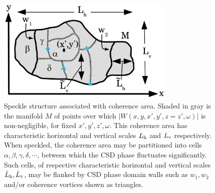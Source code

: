 \documentclass[%
 reprint,
 amsmath,amssymb,
 aps,
]{revtex4-1}
\begin{document}
\begin{figure}
\includegraphics[width=8.5cm]{Figures/CoherenceAreas.png}
\caption{Speckle structure associated with coherence area.  Shaded in gray is the manifold $M$ of points  over which $|W(x,y,x',y',z=z',\omega)|$ is non-negligible, for fixed $x',y',z',\omega$.  This coherence area has characteristic horizontal and vertical scales $L_{\textrm h}$ and $L_{\textrm v}$ respectively.  When speckled, the coherence area may be partitioned into cells $\alpha, \beta,\gamma,\delta,\cdots$, between which the CSD phase fluctuates significantly.  Such cells, of respective characteristic horizontal and vertical scales $\tilde{L}_{\textrm h},\tilde{L}_{\textrm v}$, may be flanked by CSD phase domain walls such as $w_1,w_2$ and/or coherence vortices shown as triangles.}
\label{CoherenceAreas}
\end{figure}
\end{document}
